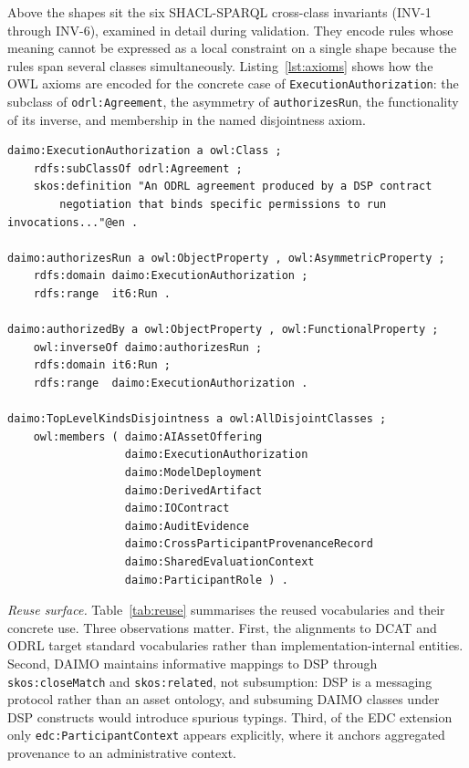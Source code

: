 \documentclass[Afour,sagev,times]{sagej}
\newcommand{\code}[1]{\texttt{#1}}
\begin{document}
Above the shapes sit the six SHACL-SPARQL cross-class invariants (INV-1 through INV-6), examined in detail during validation. They encode rules whose meaning cannot be expressed as a local constraint on a single shape because the rules span several classes simultaneously. Listing~\ref{lst:axioms} shows how the OWL axioms are encoded for the concrete case of \code{ExecutionAuthorization}: the subclass of \code{odrl:Agreement}, the asymmetry of \code{authorizesRun}, the functionality of its inverse, and membership in the named disjointness axiom.

\begin{lstlisting}[label=lst:axioms,caption={Core axioms around \code{ExecutionAuthorization}.}]
daimo:ExecutionAuthorization a owl:Class ;
    rdfs:subClassOf odrl:Agreement ;
    skos:definition "An ODRL agreement produced by a DSP contract
        negotiation that binds specific permissions to run invocations..."@en .

daimo:authorizesRun a owl:ObjectProperty , owl:AsymmetricProperty ;
    rdfs:domain daimo:ExecutionAuthorization ;
    rdfs:range  it6:Run .

daimo:authorizedBy a owl:ObjectProperty , owl:FunctionalProperty ;
    owl:inverseOf daimo:authorizesRun ;
    rdfs:domain it6:Run ;
    rdfs:range  daimo:ExecutionAuthorization .

daimo:TopLevelKindsDisjointness a owl:AllDisjointClasses ;
    owl:members ( daimo:AIAssetOffering
                  daimo:ExecutionAuthorization
                  daimo:ModelDeployment
                  daimo:DerivedArtifact
                  daimo:IOContract
                  daimo:AuditEvidence
                  daimo:CrossParticipantProvenanceRecord
                  daimo:SharedEvaluationContext
                  daimo:ParticipantRole ) .
\end{lstlisting}

\medskip\noindent\emph{Reuse surface.}\label{sec:reuse}
Table~\ref{tab:reuse} summarises the reused vocabularies and their concrete use. Three observations matter. First, the alignments to DCAT and ODRL target standard vocabularies rather than implementation-internal entities. Second, DAIMO maintains informative mappings to DSP through \code{skos:closeMatch} and \code{skos:related}, not subsumption: DSP is a messaging protocol rather than an asset ontology, and subsuming DAIMO classes under DSP constructs would introduce spurious typings. Third, of the EDC extension only \code{edc:ParticipantContext} appears explicitly, where it anchors aggregated provenance to an administrative context.
\end{document}
